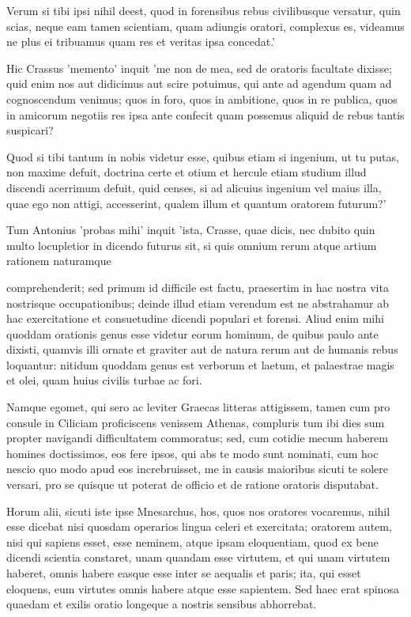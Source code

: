  Verum si tibi ipsi nihil deest, quod in forensibus rebus civilibusque versatur, quin scias, neque eam tamen scientiam, quam adiungis oratori, complexus es, videamus ne plus ei tribuamus quam res et veritas ipsa concedat.'

 Hic Crassus 'memento' inquit 'me non de mea, sed de oratoris facultate dixisse; quid enim nos aut didicimus aut scire potuimus, qui ante ad agendum quam ad cognoscendum venimus; quos in foro, quos in ambitione, quos in re publica, quos in amicorum negotiis res ipsa ante confecit quam possemus aliquid de rebus tantis suspicari?

 Quod si tibi tantum in nobis videtur esse, quibus etiam si ingenium, ut tu putas, non maxime defuit, doctrina certe et otium et hercule etiam studium illud discendi acerrimum defuit, quid censes, si ad alicuius ingenium vel maius illa, quae ego non attigi, accesserint, qualem illum et quantum oratorem futurum?'

 Tum Antonius 'probas mihi' inquit 'ista, Crasse, quae dicis, nec dubito quin multo locupletior in dicendo futurus sit, si quis omnium rerum atque artium rationem naturamque

 comprehenderit; sed primum id difficile est factu, praesertim in hac nostra vita nostrisque occupationibus; deinde illud etiam verendum est ne abstrahamur ab hac exercitatione et consuetudine dicendi populari et forensi. Aliud enim mihi quoddam orationis genus esse videtur eorum hominum, de quibus paulo ante dixisti, quamvis illi ornate et graviter aut de natura rerum aut de humanis rebus loquantur: nitidum quoddam genus est verborum et laetum, et palaestrae magis et olei, quam huius civilis turbae ac fori.

 Namque egomet, qui sero ac leviter Graecas litteras attigissem, tamen cum pro consule in Ciliciam proficiscens venissem Athenas, compluris tum ibi dies sum propter navigandi difficultatem commoratus; sed, cum cotidie mecum haberem homines doctissimos, eos fere ipsos, qui abs te modo sunt nominati, cum hoc nescio quo modo apud eos increbruisset, me in causis maioribus sicuti te solere versari, pro se quisque ut poterat de officio et de ratione oratoris disputabat.

 Horum alii, sicuti iste ipse Mnesarchus, hos, quos nos oratores vocaremus, nihil esse dicebat nisi quosdam operarios lingua celeri et exercitata; oratorem autem, nisi qui sapiens esset, esse neminem, atque ipsam eloquentiam, quod ex bene dicendi scientia constaret, unam quandam esse virtutem, et qui unam virtutem haberet, omnis habere easque esse inter se aequalis et paris; ita, qui esset eloquens, eum virtutes omnis habere atque esse sapientem. Sed haec erat spinosa quaedam et exilis oratio longeque a nostris sensibus abhorrebat.

